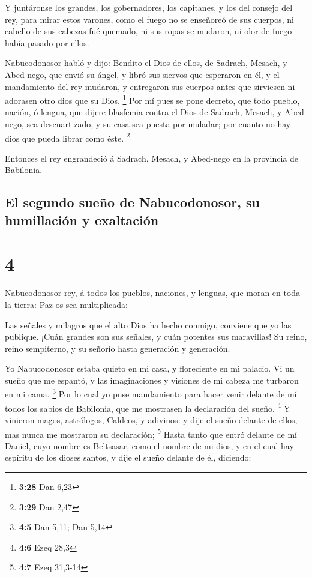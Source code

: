  Y juntáronse los grandes, los gobernadores, los capitanes,
y los del consejo del rey, para mirar estos varones, como el fuego no se
enseñoreó de sus cuerpos, ni cabello de sus cabezas fué quemado, ni sus
ropas se mudaron, ni olor de fuego había pasado por ellos.

 Nabucodonosor habló y dijo: Bendito el Dios de ellos, de
Sadrach, Mesach, y Abed-nego, que envió su ángel, y libró sus siervos
que esperaron en él, y el mandamiento del rey mudaron, y entregaron sus
cuerpos antes que sirviesen ni adorasen otro dios que su Dios.
\footnote{\textbf{3:28} Dan 6,23}  Por mí pues se pone
decreto, que todo pueblo, nación, ó lengua, que dijere blasfemia contra
el Dios de Sadrach, Mesach, y Abed-nego, sea descuartizado, y su casa
sea puesta por muladar; por cuanto no hay dios que pueda librar como
éste. \footnote{\textbf{3:29} Dan 2,47}

 Entonces el rey engrandeció á Sadrach, Mesach, y Abed-nego
en la provincia de Babilonia.

\hypertarget{el-segundo-sueuxf1o-de-nabucodonosor-su-humillaciuxf3n-y-exaltaciuxf3n}{%
\subsection{El segundo sueño de Nabucodonosor, su humillación y
exaltación}\label{el-segundo-sueuxf1o-de-nabucodonosor-su-humillaciuxf3n-y-exaltaciuxf3n}}

\hypertarget{section-3}{%
\section{4}\label{section-3}}

 Nabucodonosor rey, á todos los pueblos, naciones, y
lenguas, que moran en toda la tierra: Paz os sea multiplicada:

 Las señales y milagros que el alto Dios ha hecho conmigo,
conviene que yo las publique.  ¡Cuán grandes son sus
señales, y cuán potentes sus maravillas! Su reino, reino sempiterno, y
su señorío hasta generación y generación.

 Yo Nabucodonosor estaba quieto en mi casa, y floreciente en
mi palacio.  Vi un sueño que me espantó, y las imaginaciones
y visiones de mi cabeza me turbaron en mi cama. \footnote{\textbf{4:5}
  Dan 5,11; Dan 5,14}  Por lo cual yo puse mandamiento para
hacer venir delante de mí todos los sabios de Babilonia, que me
mostrasen la declaración del sueño. \footnote{\textbf{4:6} Ezeq 28,3}
 Y vinieron magos, astrólogos, Caldeos, y adivinos: y dije
el sueño delante de ellos, mas nunca me mostraron su declaración;
\footnote{\textbf{4:7} Ezeq 31,3-14}  Hasta tanto que entró
delante de mí Daniel, cuyo nombre es Beltsasar, como el nombre de mi
dios, y en el cual hay espíritu de los dioses santos, y dije el sueño
delante de él, diciendo:

